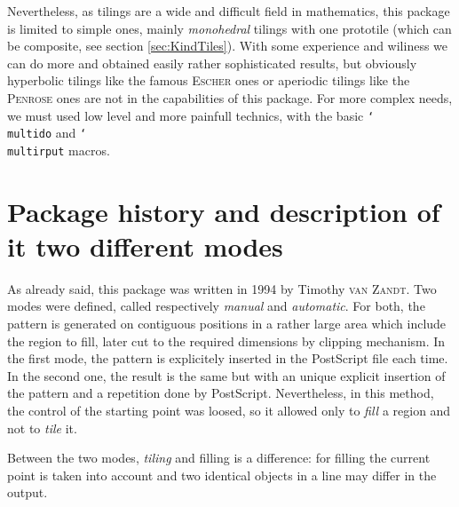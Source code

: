 \documentclass[fontsize=11pt,english,BCOR=10mm,DIV=12,bibliography=totoc,parskip=false,
   headings=small, headinclude=false,footinclude=false,oneside]{pst-doc}
\DeclareRobustCommand\cs[1]{\texttt{\char`\\#1}}
\begin{document}
Nevertheless, as tilings are a wide and difficult field in mathematics, this
package is limited to simple ones, mainly \emph{monohedral} tilings with one
prototile (which can be composite, see section \ref{sec:KindTiles}). With some
experience and wiliness we can do more and obtained easily rather
sophisticated results, but obviously hyperbolic tilings like the famous
\textsc{Escher} ones or aperiodic tilings like the \textsc{Penrose} ones are
not in the capabilities of this package. For more complex needs, we must used
low level and more painfull technics, with the basic \cs{multido}
and \cs{multirput} macros.


\newcommand\Square{\begin{pspicture}(1,1)\psframe[dimen=middle](1,1)\end{pspicture}}
\newcommand\Tiling[2][]{%
 \begin{pspicture}#2
     \psframe[fillstyle=boxfill,#1]#2
\end{pspicture}}


\section{Package history and description of it two different modes}
%
 As already said, this package was written in 1994 by Timothy \textsc{van
Zandt}. Two modes were defined, called respectively \emph{manual} and
\emph{automatic}. For both, the pattern is generated on contiguous positions in
a rather large area which include the region to fill, later cut to the
required dimensions by clipping mechanism. In the first mode, the pattern is
explicitely inserted in the PostScript file each time. In the second one, the
result is the same but with an unique explicit insertion of the pattern and a
repetition done by PostScript. Nevertheless, in this method, the control of
the starting point was loosed, so it allowed only to \emph{fill} a region and
not to \emph{tile} it.

Between the two modes, \emph{tiling} and filling is a difference: for filling the current point
is taken into account and two identical objects in a line may differ in the output.
\end{document}
